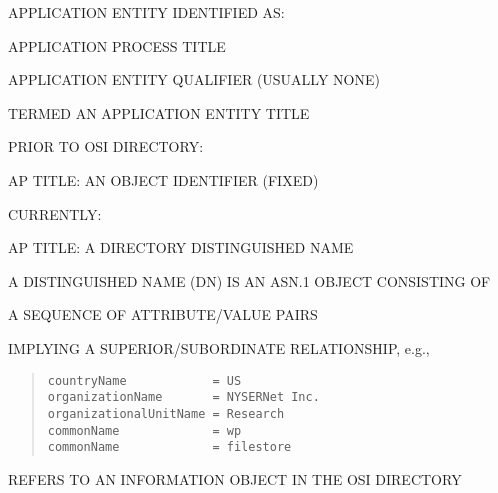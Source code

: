 \begin{bwslide}

\begin{nrtc}
\item	APPLICATION ENTITY IDENTIFIED AS:
    \begin{nrtc}
    \item	APPLICATION PROCESS TITLE

    \item	APPLICATION ENTITY QUALIFIER (USUALLY NONE)
    \end{nrtc}
    TERMED AN APPLICATION ENTITY TITLE

\item	PRIOR TO OSI DIRECTORY:
    \begin{nrtc}
    \item	AP TITLE: AN OBJECT IDENTIFIER (FIXED)
    \end{nrtc}

\item	CURRENTLY:
    \begin{nrtc}
    \item	AP TITLE: A DIRECTORY DISTINGUISHED NAME
    \end{nrtc}
\end{nrtc}
\end{bwslide}


\begin{bwslide}

\begin{nrtc}
\item	A DISTINGUISHED NAME (DN) IS AN ASN.1 OBJECT CONSISTING OF
    \begin{nrtc}
    \item	A SEQUENCE OF ATTRIBUTE/VALUE PAIRS
    \end{nrtc}
    IMPLYING A SUPERIOR/SUBORDINATE RELATIONSHIP, e.g.,
\begin{quote}\small\begin{verbatim}
countryName            = US
organizationName       = NYSERNet Inc.
organizationalUnitName = Research
commonName             = wp
commonName             = filestore
\end{verbatim}\end{quote}

\item	REFERS TO AN INFORMATION OBJECT IN THE OSI DIRECTORY
\end{nrtc}
\end{bwslide}


